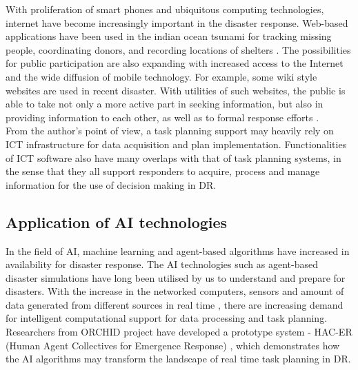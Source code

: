 With proliferation of smart phones and ubiquitous computing technologies, internet have become increasingly important in the disaster response. Web-based applications have been used in the indian ocean tsunami for tracking missing people, coordinating donors, and recording locations of shelters \cite{Wattegama2012}. The possibilities for public participation are also expanding with increased access to the Internet and the wide diffusion of mobile technology. For example, some wiki style websites are used in recent disaster. With utilities of such websites, the public is able to take not only a more active part in seeking information, but also in providing information to each other, as well as to formal response efforts \cite{Palen2007}.\\

From the author's point of view, a task planning support may heavily rely on ICT infrastructure for data acquisition and plan implementation. Functionalities of ICT software  also have many overlaps with that of task planning systems, in the sense that they all support responders to acquire, process and manage information for the use of decision making in DR. \\


\subsection{Application of AI technologies}\label{sec:lraisupport}
In the field of AI, machine learning and agent-based algorithms have increased in availability for disaster response. The AI technologies such as agent-based disaster simulations \cite{Okaya,Scerri2005} have long been utilised by us to understand and prepare for disasters. With the increase in the networked computers, sensors and amount of data generated from different sources in real time \cite{Ramchurn}, there are increasing demand for intelligent computational support for data processing and task planning. Researchers from ORCHID project have developed a prototype system - HAC-ER (Human Agent Collectives for Emergence Response) \cite{Jennings2014,Ramchurn2015,Ramchurn2015a}, which demonstrates how the AI algorithms may transform the landscape of real time task planning in DR.\\

